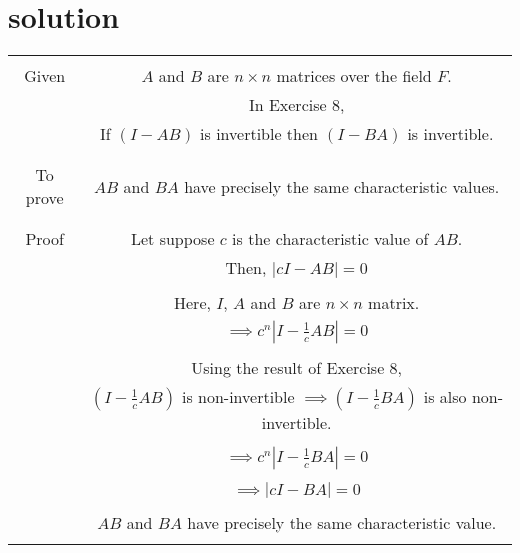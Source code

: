 \documentclass[journal,12pt,twocolumn]{IEEEtran}
\begin{document}
\section{solution}
\begin{table}[h!]
\begin{center}
\resizebox{\columnwidth}{!}
{
\begin{tabular}{|c|c|}
\hline
& \\
Given & $A$ and $B$ are $n \times n$ matrices over the field $F$.\\
& In Exercise 8,\\
& If $(I-AB)$ is invertible then $(I-BA)$ is invertible.\\
&\\
\hline
& \\
To prove & $AB$ and $BA$ have precisely the same characteristic values.\\
& \\
\hline
& \\
Proof  & Let suppose $c$ is  the characteristic value of $AB$.\\
& Then, $|cI-AB|=0$\\
& \\
& Here, $I$, $A$ and $B$ are $n \times n$ matrix.\\
& $\implies c^n|I-\frac{1}{c}AB|=0$ \\
&\\
& Using the result of Exercise $8$,\\
& $(I-\frac{1}{c}AB)$ is non-invertible $\implies (I-\frac{1}{c}BA)$ is also non-invertible.\\
&\\
& $\implies c^n|I-\frac{1}{c}BA|=0$ \\
& \\
& $\implies |cI-BA|=0$\\
& \\
& $AB$ and $BA$ have precisely the same characteristic value.\\
& \\
\hline
\end{tabular}
}
\end{center}
\end{table}
\end{document}
